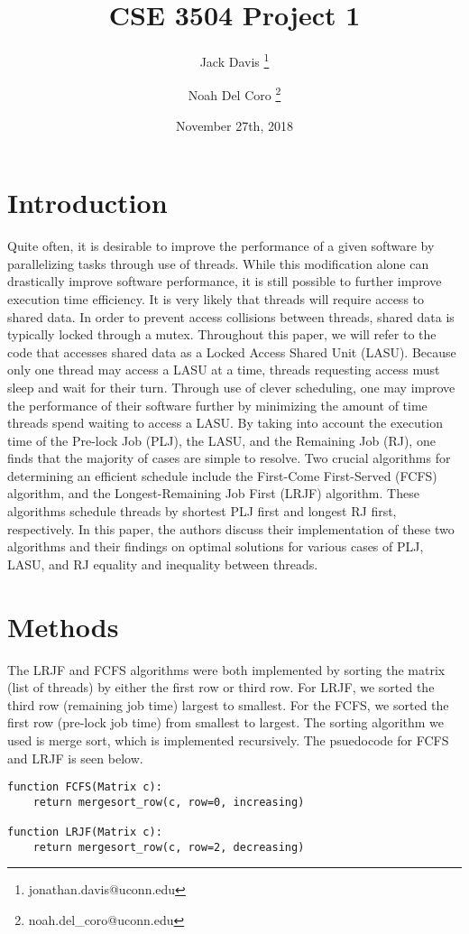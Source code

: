 \documentclass[letterpaper,12pt]{article}
\begin{document}
\title{CSE 3504  Project 1}
\author[1]{Jack Davis \thanks{jonathan.davis@uconn.edu}}
\author[1]{Noah Del Coro \thanks{noah.del\_coro@uconn.edu}}
\date{November 27th, 2018}
\maketitle

\section{Introduction}
Quite often, it is desirable to improve the performance of a given software by parallelizing tasks through use of threads.
While this modification alone can drastically improve software performance, it is still possible to further improve execution time efficiency.
It is very likely that threads will require access to shared data.
In order to prevent access collisions between threads, shared data is typically locked through a mutex.
Throughout this paper, we will refer to the code that accesses shared data as a Locked Access Shared Unit (LASU).
Because only one thread may access a LASU at a time, threads requesting access must sleep and wait for their turn.
Through use of clever scheduling, one may improve the performance of their software further by minimizing the amount of time threads spend waiting to access a LASU.
By taking into account the execution time of the Pre-lock Job (PLJ), the LASU, and the Remaining Job (RJ), one finds that the majority of cases are simple to resolve.
Two crucial algorithms for determining an efficient schedule include the First-Come First-Served (FCFS) algorithm, and the Longest-Remaining Job First (LRJF) algorithm.
These algorithms schedule threads by shortest PLJ first and longest RJ first, respectively.
In this paper, the authors discuss their implementation of these two algorithms and their findings on optimal solutions for various cases of PLJ, LASU, and RJ equality and inequality between threads.


\section{Methods}
The LRJF and FCFS algorithms were both implemented by sorting the matrix (list of threads) by either the first row or third row. 
For LRJF, we sorted the third row (remaining job time) largest to smallest.
For the FCFS, we sorted the first row (pre-lock job time) from smallest to largest.
The sorting algorithm we used is merge sort, which is implemented recursively. 
The psuedocode for FCFS and LRJF is seen below.
\begin{verbatim}
function FCFS(Matrix c):
    return mergesort_row(c, row=0, increasing)
    
function LRJF(Matrix c):
    return mergesort_row(c, row=2, decreasing)
\end{verbatim}
\end{document}
